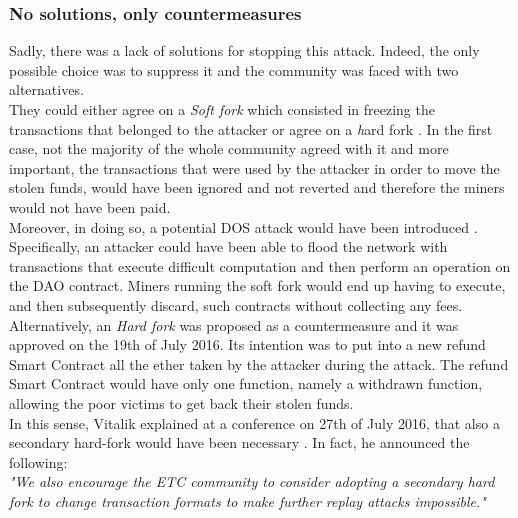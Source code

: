 \subsubsection{No solutions, only countermeasures}
Sadly, there was a lack of solutions for stopping this attack. Indeed, the only possible choice was to suppress it and the community was faced with two alternatives.
\\They could either agree on a \textit{Soft fork} which consisted in freezing the transactions that belonged to the attacker or agree on a {\textit hard fork} . In the first case, not the majority of the whole community agreed with it and more important, the transactions that were used by the attacker in order to move the stolen funds, would have been ignored and not reverted and therefore the miners would not have been paid.
\\Moreover, in doing so, a potential DOS attack would have been introduced \cite{ok}. 
Specifically, an attacker could have been able to flood the network with transactions that execute difficult computation and then perform an operation on the DAO contract. Miners running the soft fork would end up having to execute, and then subsequently discard, such contracts without collecting any fees.
\\Alternatively, an \textit{Hard fork} was proposed as a countermeasure and it was approved on the 19th of July 2016. Its intention was to put into a new refund Smart Contract all the ether taken by the attacker during the attack. The refund Smart Contract would have only one function, namely a withdrawn function, allowing the poor victims to get back their stolen funds. \\



In this sense, Vitalik explained at a conference on 27th of July 2016, that also a secondary hard-fork would have been necessary \cite{vit}. In fact, he announced the following: \\ 


\textit{"We also encourage the ETC community to consider adopting a secondary hard fork to change transaction formats to make further replay attacks impossible."} 


